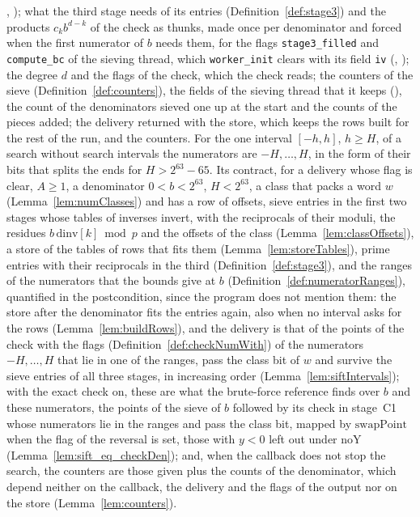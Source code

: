 \begin{definition}
  , ); what the third stage needs
  of its entries (Definition~\ref{def:stage3}) and the products $c_k b^{d - k}$ of the check as
  thunks, made once per denominator and forced when the first numerator of $b$ needs them, for the
  flags \verb|stage3_filled| and \verb|compute_bc| of the sieving thread, which \verb|worker_init|
  clears with its field \verb|iv| (,
  ); the degree $d$ and the flags of the check, which the check
  reads; the counters of the sieve (Definition~\ref{def:counters}), the fields of the sieving thread
  that it keeps (), the count of the denominators sieved one up at
  the start and the counts of the pieces added; the delivery returned with the store, which keeps
  the rows built for the rest of the run, and the counters. For the one interval $[-h, h]$,
  $h \ge H$, of a search without search intervals the numerators are $-H, \dots, H$, in the form of
  their bits that splits the ends for $H > 2^{63} - 65$. Its contract, for a delivery whose flag is
  clear, $A \ge 1$, a denominator $0 < b < 2^{63}$, $H < 2^{63}$, a class that packs a word $w$
  (Lemma~\ref{lem:numClasses}) and has a row of offsets, sieve entries in the first two stages whose
  tables of inverses invert, with the reciprocals of their moduli, the residues
  $b\,\mathrm{dinv}[k] \bmod p$ and the offsets of the class (Lemma~\ref{lem:classOffsets}), a store
  of the tables of rows that fits them (Lemma~\ref{lem:storeTables}), prime entries with their
  reciprocals in the third (Definition~\ref{def:stage3}), and the ranges of the numerators that the
  bounds give at $b$ (Definition~\ref{def:numeratorRanges}), quantified in the postcondition, since
  the program does not mention them: the store after the denominator fits the entries again, also
  when no interval asks for the rows (Lemma~\ref{lem:buildRows}), and the delivery is that of the
  points of the check with the flags (Definition~\ref{def:checkNumWith}) of the numerators
  $-H, \dots, H$ that lie in one of the ranges, pass the class bit of $w$ and survive the sieve
  entries of all three stages, in increasing order (Lemma~\ref{lem:siftIntervals}); with the exact
  check on, these are what the brute-force reference finds over $b$ and these numerators, the points
  of the sieve of $b$ followed by its check in stage~C1 whose numerators lie in the ranges and pass
  the class bit, mapped by $\mathrm{swapPoint}$ when the flag of the reversal is set, those with
  $y < 0$ left out under $\mathrm{noY}$ (Lemma~\ref{lem:sift_eq_checkDen}); and, when the callback
  does not stop the search, the counters are those given plus the counts of the denominator, which
  depend neither on the callback, the delivery and the flags of the output nor on the store
  (Lemma~\ref{lem:counters}).
\end{definition}

